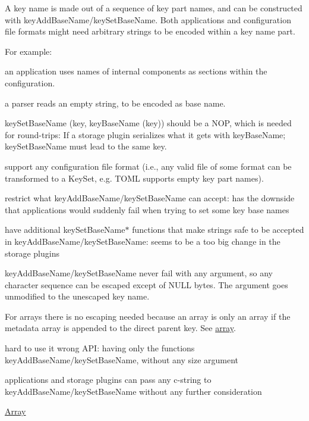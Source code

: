 A key name is made out of a sequence of key part names, and can be constructed with {\ttfamily key\+Add\+Base\+Name/key\+Set\+Base\+Name}. Both applications and configuration file formats might need arbitrary strings to be encoded within a key name part.

For example\+:


\begin{DoxyItemize}
\item an application uses names of internal components as sections within the configuration.
\item a parser reads an empty string, to be encoded as base name.
\end{DoxyItemize}


\begin{DoxyItemize}
\item {\ttfamily key\+Set\+Base\+Name (key, key\+Base\+Name (key))} should be a N\+OP, which is needed for round-\/trips\+: If a storage plugin serializes what it gets with {\ttfamily key\+Base\+Name}; {\ttfamily key\+Set\+Base\+Name} must lead to the same key.
\item support any configuration file format (i.\+e., any valid file of some format can be transformed to a Key\+Set, e.\+g. T\+O\+ML supports empty key part names).
\end{DoxyItemize}


\begin{DoxyItemize}
\item restrict what {\ttfamily key\+Add\+Base\+Name/key\+Set\+Base\+Name} can accept\+: has the downside that applications would suddenly fail when trying to set some key base names
\item have additional {\ttfamily key\+Set\+Base\+Name$\ast$} functions that make strings safe to be accepted in {\ttfamily key\+Add\+Base\+Name/key\+Set\+Base\+Name}\+: seems to be a too big change in the storage plugins
\end{DoxyItemize}

{\ttfamily key\+Add\+Base\+Name/key\+Set\+Base\+Name} never fail with any argument, so any character sequence can be escaped except of N\+U\+LL bytes. The argument goes unmodified to the unescaped key name.

For arrays there is no escaping needed because an array is only an array if the metadata {\ttfamily array} is appended to the direct parent key. See \hyperlink{doc_decisions_array_md}{array}.


\begin{DoxyItemize}
\item hard to use it wrong A\+PI\+: having only the functions {\ttfamily key\+Add\+Base\+Name/key\+Set\+Base\+Name}, without any size argument
\item applications and storage plugins can pass any c-\/string to {\ttfamily key\+Add\+Base\+Name/key\+Set\+Base\+Name} without any further consideration
\end{DoxyItemize}


\begin{DoxyItemize}
\item \hyperlink{doc_decisions_array_md}{Array}
\end{DoxyItemize}